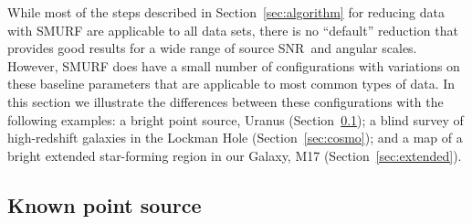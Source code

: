 \documentclass[useAMS,usenatbib,nofootinbib]{mn2e}
\newcommand{\snr}{SNR}
\begin{document}
While most of the steps described in Section~\ref{sec:algorithm} for
reducing data with SMURF are applicable to all data sets, there is no
``default'' reduction that provides good results for a wide range of
source \snr\ and angular scales. However, SMURF does have a small
number of configurations with variations on these baseline parameters
that are applicable to most common types of data. In this section we
illustrate the differences between these configurations with the
following examples: a bright point source, Uranus
(Section~\ref{sec:point}); a blind survey of high-redshift galaxies in
the Lockman Hole (Section~\ref{sec:cosmo}); and a map of a bright
extended star-forming region in our Galaxy, M17
(Section~\ref{sec:extended}).

\subsection{Known point source}
\label{sec:point}
\end{document}
